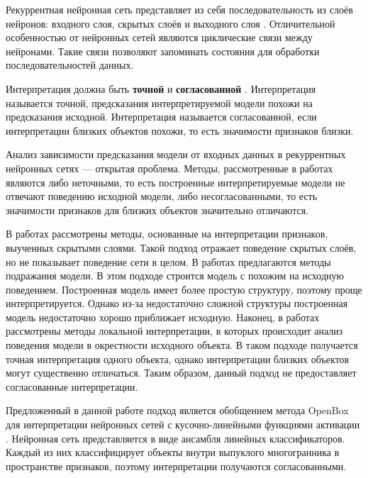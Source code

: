 \documentclass[a4paper, 12pt]{article}
\begin{document}
Рекуррентная нейронная сеть представляет из себя последовательность из слоёв нейронов: входного слоя, скрытых слоёв и выходного слоя \cite{sherstinsky2020fundrnn}. Отличительной особенностью от нейронных сетей являются циклические связи между нейронами. Такие связи позволяют запоминать состояния для обработки последовательностей данных.

Интерпретация должна быть \textbf{точной} и \textbf{согласованной} \cite{chu2019exact}. Интерпретация называется точной, предсказания интерпретируемой модели похожи на предсказания исходной. Интерпретация называется согласованной, если интерпретации близких объектов похожи, то есть значимости признаков близки.

Анализ зависимости предсказания модели от входных данных в рекуррентных нейронных сетях --- открытая проблема. Методы, рассмотренные в работах \cite{dosovitskiy2016inverting, zhou2018interpreting, NIPS2014_ea8fcd92, bastani2019interpreting, zhou2015learning, simonyan2014deep} являются либо неточными, то есть построенные интерпретируемые модели не отвечают поведению исходной модели, либо несогласованными, то есть значимости признаков для близких объектов значительно отличаются.

В работах \cite{dosovitskiy2016inverting, zhou2018interpreting} рассмотрены методы, основанные на интерпретации признаков, выученных скрытыми слоями. Такой подход отражает поведение скрытых слоёв, но не показывает поведение сети в целом. В работах \cite{NIPS2014_ea8fcd92, bastani2019interpreting} предлагаются методы подражания модели. В этом подходе строится модель с похожим на исходную поведением. Построенная модель имеет более простую структуру, поэтому проще интерпретируется. Однако из-за недостаточно сложной структуры построенная модель недостаточно хорошо приближает исходную. Наконец, в работах \cite{zhou2015learning, simonyan2014deep} рассмотрены методы локальной интерпретации, в которых происходит анализ поведения модели в окрестности исходного объекта. В таком подходе получается точная интерпретация одного объекта, однако интерпретации близких объектов могут существенно отличаться. Таким образом, данный подход не предоставляет согласованные интерпретации.

Предложенный в данной работе подход является обобщением метода OpenBox для интерпретации нейронных сетей с кусочно-линейными  функциями активации \cite{chu2019exact}. Нейронная сеть представляется в виде ансамбля линейных классификаторов. Каждый из них классифицирует объекты внутри выпуклого многогранника в пространстве признаков, поэтому интерпретации получаются согласованными.
\end{document}
